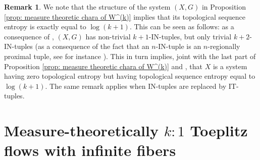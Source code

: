 \documentclass[titlepage,reqno,10pt]{amsart}
\theoremstyle{definition}
\newtheorem{remark}[theorem]{Remark}
\begin{document}
\begin{remark} We note that the structure of the system $(X,G)$ in Proposition \ref{prop: measure theoretic chara of W^(k)} implies that its topological sequence entropy is exactly equal to $\log(k+1)$. This can be seen as follows: as a consequence of \cite[Proposition 3.7]{HLSY21}, $(X,G)$ has non-trivial $k+1$-IN-tuples, but only trivial $k+2$-IN-tuples (as a consequence of the fact that an $n$-IN-tuple is an $n$-regionally proximal tuple, see for instance \cite[Proposition 2.6]{GoLeMu25}).
This in turn implies, joint with the last part of Proposition \ref{prop: measure theoretic chara of W^(k)} and \cite[Theorem 4.4]{HuYe09}, that $X$ is a system having zero topological entropy but having topological sequence entropy equal to $\log(k+1)$. The same remark applies when IN-tuples are replaced by IT-tuples.
\end{remark}
 
 


\section{Measure-theoretically $k:1$ Toeplitz flows with infinite fibers} \label{sect: infinite max rank}
\end{document}
